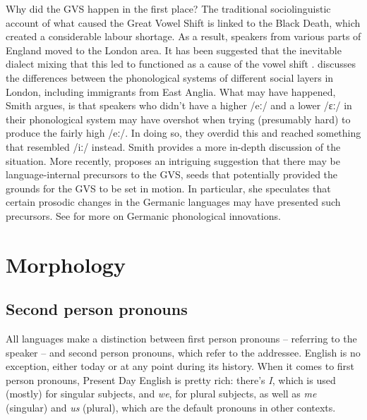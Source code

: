 \begin{soundbox}{Why did the GVS happen in the first place?}
The traditional sociolinguistic account of what caused the Great Vowel Shift is linked to the Black Death, which created a considerable labour shortage. As a result, speakers from various parts of England moved to the London area. It has been suggested that the inevitable dialect mixing that this led to functioned as a cause of the vowel shift \citep[250]{MillHay2018}. \citet{Smith1993} discusses the differences between the phonological systems of different social layers in London, including immigrants from East Anglia. What may have happened, Smith argues, is that speakers who didn't have a higher /eː/ and a lower /ɛː/ in their phonological system may have overshot when trying (presumably hard) to produce the fairly high /eː/. In doing so, they overdid this and reached something that resembled /iː/ instead. Smith provides a more in-depth discussion of the situation. More recently, \citet[chapter 9]{Stenbrenden2016} proposes an intriguing suggestion that there may be language-internal precursors to the GVS, seeds that potentially provided the grounds for the GVS to be set in motion. In particular, she speculates that certain prosodic changes in the Germanic languages may have presented such precursors. See  for more on Germanic phonological innovations.
\end{soundbox}


\section{Morphology}\largerpage

\subsection{Second person pronouns}\label{EModE-pronouns}

All languages make a distinction between first person pronouns -- referring to the speaker -- and second person pronouns, which refer to the addressee. English is no exception, either today or at any point during its history. When it comes to first person pronouns, Present Day English is pretty rich: there's \textit{I}, which is used (mostly) for singular subjects, and \textit{we}, for plural subjects, as well as \textit{me} (singular) and \textit{us} (plural), which are the default pronouns in other contexts.

